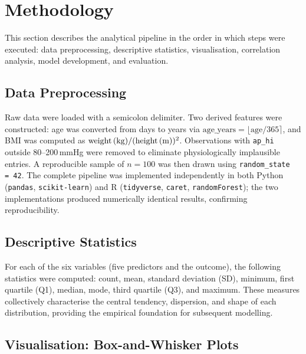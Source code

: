 ﻿\documentclass[conference]{IEEEtran}
\begin{document}
\section{Methodology}
\label{sec:method}

This section describes the analytical pipeline in the order in which steps were executed: data preprocessing, descriptive statistics, visualisation, correlation analysis, model development, and evaluation.

\subsection{Data Preprocessing}

Raw data were loaded with a semicolon delimiter. Two derived features were constructed: age was converted from days to years via $\text{age\_years} = \lfloor\text{age}/365\rceil$, and BMI was computed as $\text{weight\,(kg)}/(\text{height\,(m)})^2$. Observations with \texttt{ap\_hi} outside 80--200\,mmHg were removed to eliminate physiologically implausible entries. A reproducible sample of $n=100$ was then drawn using \texttt{random\_state\,=\,42}. The complete pipeline was implemented independently in both Python (\texttt{pandas}, \texttt{scikit-learn}) and R (\texttt{tidyverse}, \texttt{caret}, \texttt{randomForest}); the two implementations produced numerically identical results, confirming reproducibility.

\subsection{Descriptive Statistics}

For each of the six variables (five predictors and the outcome), the following statistics were computed: count, mean, standard deviation (SD), minimum, first quartile (Q1), median, mode, third quartile (Q3), and maximum. These measures collectively characterise the central tendency, dispersion, and shape of each distribution, providing the empirical foundation for subsequent modelling.

\subsection{Visualisation: Box-and-Whisker Plots}
\end{document}
